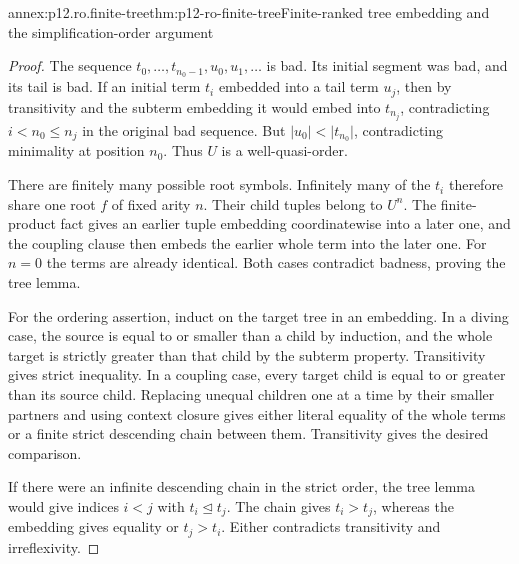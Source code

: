 \begin{annexitem}{annex:p12.ro.finite-tree}{thm:p12-ro-finite-tree}{Finite-ranked tree embedding and the simplification-order argument}
\begin{proof}
The sequence
\(t_0,\ldots,t_{n_0-1},u_0,u_1,\ldots\) is bad. Its initial
segment was bad, and its tail is bad. If an initial term \(t_i\)
embedded into a tail term \(u_j\), then by transitivity and the
subterm embedding it would embed into \(t_{n_j}\), contradicting
\(i<n_0\leq n_j\) in the original bad sequence. But
\(\lvert u_0\rvert<\lvert t_{n_0}\rvert\), contradicting
minimality at position \(n_0\). Thus \(U\) is a well-quasi-order.

There are finitely many possible root symbols. Infinitely many of
the \(t_i\) therefore share one root \(f\) of fixed arity \(n\).
Their child tuples belong to \(U^n\). The finite-product fact gives
an earlier tuple embedding coordinatewise into a later one, and the
coupling clause then embeds the earlier whole term into the later
one. For \(n=0\) the terms are already identical. Both cases
contradict badness, proving the tree lemma.

For the ordering assertion, induct on the target tree in an embedding.
In a diving case, the source is equal to or smaller than a child by
induction, and the whole target is strictly greater than that child
by the subterm property. Transitivity gives strict inequality. In a
coupling case, every target child is equal to or greater than its
source child. Replacing unequal children one at a time by their smaller
partners and using context closure gives either literal equality of
the whole terms or a finite strict descending chain between them.
Transitivity gives the desired comparison.

If there were an infinite descending chain in the strict order, the
tree lemma would give indices \(i<j\) with \(t_i\unlhd t_j\).
The chain gives \(t_i>t_j\), whereas the embedding gives equality
or \(t_j>t_i\). Either contradicts transitivity and irreflexivity.
\end{proof}
\end{annexitem}


